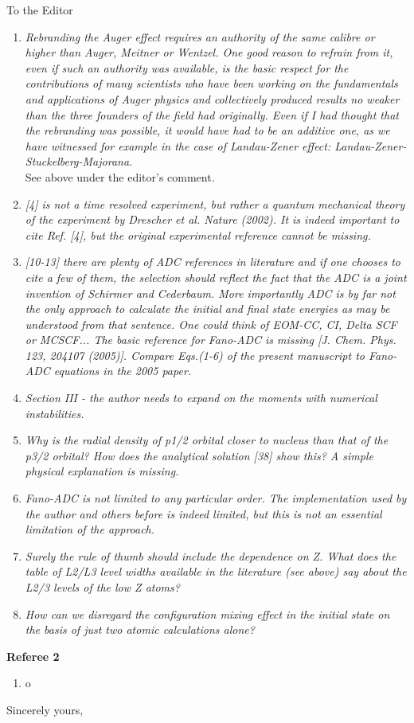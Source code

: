 \documentclass[DIN,pagenumber=false,parskip=half,fromalign=left,fromphone=false,fromemail=true,fromurl=false,fromlogo=false,fromrule=false]{scrlttr2}
\begin{document}
\begin{letter}{To the Editor}
\begin{enumerate}
 \item \emph{Rebranding the Auger effect requires an authority of the same calibre
       or higher than Auger, Meitner or Wentzel. One good reason to refrain from it,
       even if such an authority was available, is the basic respect for the contributions
       of many scientists who have been working on the fundamentals and applications
       of Auger physics and collectively produced results no weaker than the three
       founders of the field had originally. Even if I had thought that the rebranding
       was possible, it would have had to be an additive one, as we have witnessed
       for example in the case of Landau-Zener effect: Landau-Zener-Stuckelberg-Majorana.}\\
       See above under the editor's comment.
 \item \emph{[4] is not a time resolved experiment, but rather a quantum mechanical
       theory of the experiment by Drescher et al. Nature (2002). It is indeed important
       to cite Ref. [4], but the original experimental reference cannot be missing.}
 \item \emph{[10-13] there are plenty of ADC references in literature and if one
       chooses to cite a few of them, the selection should reflect the fact that the
       ADC is a joint invention of Schirmer and Cederbaum. More importantly ADC is
       by far not the only approach to calculate the initial and final state energies
       as may be understood from that sentence. One could think of EOM-CC, CI, Delta SCF
       or MCSCF... The basic reference for Fano-ADC is missing
       [J. Chem. Phys. 123, 204107 (2005)]. Compare Eqs.(1-6) of the present manuscript
       to Fano-ADC equations in the 2005 paper.}
 \item \emph{Section III - the author needs to expand on the moments with numerical
       instabilities.}
 \item \emph{Why is the radial density of p1/2 orbital closer to nucleus than that of
       the p3/2 orbital? How does the analytical solution [38] show this? A simple
       physical explanation is missing.}
 \item \emph{Fano-ADC is not limited to any particular order. The implementation
       used by the author and others before is indeed limited, but this is not an
       essential limitation of the approach.}
 \item \emph{Surely the rule of thumb should include the dependence on Z. What does
       the table of L2/L3 level widths available in the literature (see above) say
       about the L2/3 levels of the low Z atoms?}
 \item \emph{How can we disregard the configuration mixing effect in the initial
       state on the basis of just two atomic calculations alone?}
\end{enumerate}

\textbf{Referee 2}
\begin{enumerate}
 \item o
\end{enumerate}



        \closing{Sincerely yours,}
	\end{letter}
\end{document}
